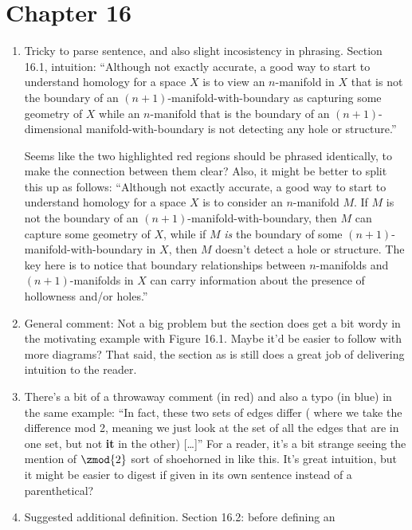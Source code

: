 \documentclass{fkletter}
\begin{document}
\section*{Chapter 16}
\begin{enumerate}
  \item Tricky to parse sentence, and also slight incosistency in phrasing.
    Section 16.1, intuition: ``Although not exactly accurate, a good way to
    start to understand homology for a space $X$ is to view an $n$-manifold in
    $X$ that is not the boundary of an
    {\color{red}$(n+1)$-manifold-with-boundary} as capturing some geometry of
    $X$ while an $n$-manifold that is the boundary of an
    {\color{red}$(n+1)$-dimensional manifold-with-boundary} is not detecting any
    hole or structure.''

    Seems like the two highlighted red regions should be phrased identically, to
    make the connection between them clear? Also, it might be better to split
    this up as follows: ``Although not exactly accurate, a good way to start to
    understand homology for a space $X$ is to consider an $n$-manifold $M$. If
    $M$ is not the boundary of an $(n+1)$-manifold-with-boundary, then $M$ can
    capture some geometry of $X$, while if $M$ \emph{is} the boundary of some
    $(n+1)$-manifold-with-boundary in $X$, then $M$ doesn't detect a hole or
    structure. The key here is to notice that boundary relationships between
    $n$-manifolds and $(n+1)$-manifolds in $X$ can carry information about the
    presence of hollowness and/or holes.''
  \item General comment: Not a big problem but the section does get a bit wordy
    in the motivating example with Figure 16.1. Maybe it'd be easier to follow
    with more diagrams? That said, the section as is still does a great job of
    delivering intuition to the reader.
  \item There's a bit of a throwaway comment (in red) and also a typo (in blue)
    in the same example: ``In fact, these two sets of edges differ ({\color{red}
      where we take the difference mod 2, meaning} we just look at the set of
    all the edges that are in one set, but not {\color{blue}\bfseries it} in the
    other) [\ldots]'' For a reader, it's a bit strange seeing the mention of
    $\zmod{2}$ sort of shoehorned in like this. It's great intuition, but it
    might be easier to digest if given in its own sentence instead of a
    parenthetical?
  \item Suggested additional definition. Section 16.2: before defining an

\end{enumerate}
\end{document}
